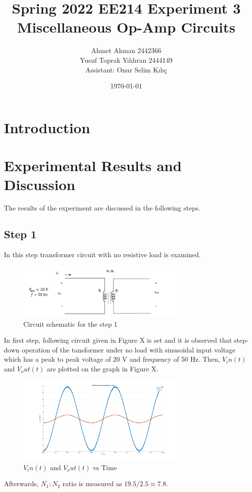 \documentclass[letterpaper,12pt]{article}
\begin{document}
\thispagestyle{empty}

\title{Spring 2022 EE214 Experiment 3  \protect\\ Miscellaneous Op-Amp Circuits}
\author{Ahmet Akman 2442366 \protect\\ Yusuf Toprak Yıldıran 2444149 \protect\\ Assistant: Onur Selim Kılıç}
\date{\today}
\maketitle
\tableofcontents
\section{Introduction}

\section{Experimental Results and Discussion}
The results of the experiment are discussed in the following steps.
%
\subsection{Step 1}
In this step transformer circuit with no resistive load is examined.
\begin{figure}[H]
    \centering
    \includegraphics[width = 0.75\textwidth]{1.png}
    \caption{Circuit schematic for the step 1}
\end{figure} 
    
In first step, following circuit given in Figure X is set and it is observed that step-down operation of the tansformer under no load with sinusoidal input voltage which has a peak to peak voltage of 20 V and frequency of
50 Hz. Then, \(V_in(t) \) and \(V_out(t)\) are plotted on the graph in Figure X.
\begin{figure}[H]
    \centering
    \includegraphics[width = 0.75\textwidth]{1_1.png}
    \caption{\(V_in(t) \) and \(V_out(t)\) vs Time}
\end{figure} 
Afterwards, \(N_1:N_2\) ratio is measured as \(19.5/2.5 \approx 7.8 \).
\end{document}
